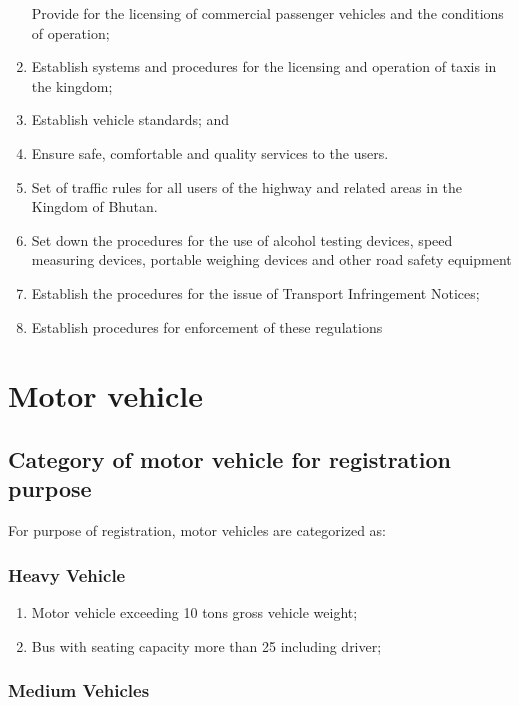 \documentclass[
]{book}
\providecommand{\tightlist}{%
  \setlength{\itemsep}{0pt}\setlength{\parskip}{0pt}}
\begin{document}
\begin{enumerate}
  Provide for the licensing of commercial passenger vehicles and the conditions of operation;
\item
  Establish systems and procedures for the licensing and operation of taxis in the kingdom;
\item
  Establish vehicle standards; and
\item
  Ensure safe, comfortable and quality services to the users.
\item
  Set of traffic rules for all users of the highway and related areas in the Kingdom of Bhutan.
\item
  Set down the procedures for the use of alcohol testing devices, speed measuring devices, portable weighing devices and other road safety equipment
\item
  Establish the procedures for the issue of Transport Infringement Notices;
\item
  Establish procedures for enforcement of these regulations
\end{enumerate}

\hypertarget{motor-vehicle}{%
\chapter{Motor vehicle}\label{motor-vehicle}}

\hypertarget{category-of-motor-vehicle-for-registration-purpose}{%
\section{Category of motor vehicle for registration purpose}\label{category-of-motor-vehicle-for-registration-purpose}}

For purpose of registration, motor vehicles are categorized as:

\hypertarget{heavy-vehicle}{%
\subsection{Heavy Vehicle}\label{heavy-vehicle}}

\begin{enumerate}
\def\labelenumi{\alph{enumi}.}
\tightlist
\item
  Motor vehicle exceeding 10 tons gross vehicle weight;
\item
  Bus with seating capacity more than 25 including driver;
\end{enumerate}

\hypertarget{medium-vehicles}{%
\subsection{Medium Vehicles}\label{medium-vehicles}}
\end{document}
